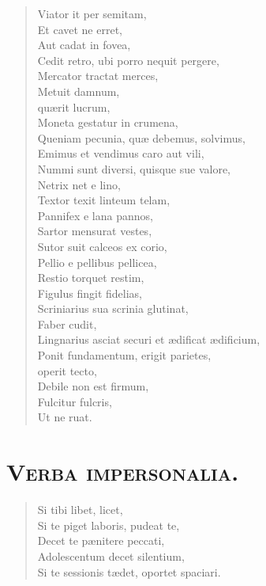 \documentclass[12pt,  postvopaper]{memoir}
\begin{document}
\begin{verse}
  Viator it per semitam,\\
  Et cavet ne erret,\\
  Aut cadat in fovea,\\
  Cedit retro, ubi porro nequit pergere,\\
  Mercator tractat merces,\\
  Metuit damnum,\\
  quærit lucrum,\\
  Moneta gestatur in crumena,\\
  Queniam pecunia, quæ debemus, solvimus,\\
  Emimus et vendimus caro aut vili,\\
  Nummi sunt diversi, quisque sue valore,\\
  Netrix net e lino,\\
  Textor texit linteum telam,\\
  Pannifex e lana pannos,\\
  Sartor mensurat vestes,\\
  Sutor suit calceos ex corio,\\
  Pellio e pellibus pellicea,\\
  Restio torquet restim,\\
  Figulus fingit fidelias,\\
  Scriniarius sua scrinia glutinat,\\
  Faber cudit,\\
  Lingnarius asciat securi et ædificat ædificium,\\
  Ponit fundamentum, erigit parietes,\\
  operit tecto,\\
  Debile non est firmum,\\
  Fulcitur fulcris,\\
  Ut ne ruat.\\
\end{verse}


\section*{\textsc{Verba impersonalia.}}

\begin{verse}

  Si tibi libet, licet,\\
  Si te piget laboris, pudeat te,\\
  Decet te pænitere peccati,\\
  Adolescentum decet silentium,\\
  Si te sessionis tædet, oportet spaciari.\\
\end{verse}
\end{document}
